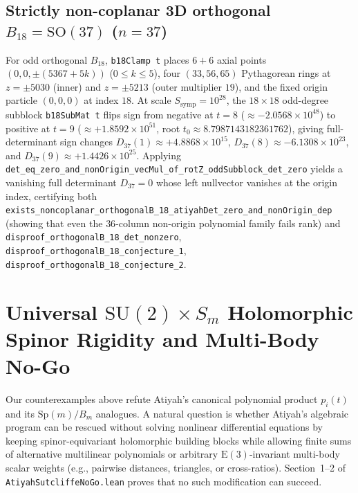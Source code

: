 \documentclass[11pt,reqno]{amsart}
\theoremstyle{remark}
\begin{document}
\subsection{Strictly non-coplanar 3D orthogonal $B_{18} = \mathrm{SO}(37)$ ($n = 37$)}
For odd orthogonal $B_{18}$, \texttt{b18Clamp t} places $6+6$ axial points $(0,0,\pm(5367 + 5k))$ ($0 \le k \le 5$), four $(33, 56, 65)$ Pythagorean rings at $z = \pm 5030$ (inner) and $z = \pm 5213$ (outer multiplier $19$), and the fixed origin particle $(0, 0, 0)$ at index $18$.
At scale $S_{\mathrm{symp}} = 10^{28}$, the $18 \times 18$ odd-degree subblock \texttt{b18SubMat t} flips sign from negative at $t = 8$ ($\approx -2.0568 \times 10^{48}$) to positive at $t = 9$ ($\approx +1.8592 \times 10^{51}$, root $t_0 \approx 8.7987143182361762$), giving full-determinant sign changes $D_{37}(1) \approx +4.8868 \times 10^{15}$, $D_{37}(8) \approx -6.1308 \times 10^{23}$, and $D_{37}(9) \approx +1.4426 \times 10^{25}$.
Applying \texttt{det\_eq\_zero\_and\_nonOrigin\_vecMul\_of\_rotZ\_oddSubblock\_det\_zero} yields a vanishing full determinant $D_{37} = 0$ whose left nullvector vanishes at the origin index, certifying both \texttt{exists\_noncoplanar\_orthogonalB\_18\_atiyahDet\_zero\_and\_nonOrigin\_dep} (showing that even the $36$-column non-origin polynomial family fails rank) and \texttt{disproof\_orthogonalB\_18\_det\_nonzero}, \texttt{disproof\_orthogonalB\_18\_conjecture\_1}, \texttt{disproof\_orthogonalB\_18\_conjecture\_2}.

\section{Universal $\mathrm{SU}(2) \times S_m$ Holomorphic Spinor Rigidity and Multi-Body No-Go}\label{sec:nogo}

Our counterexamples above refute Atiyah's canonical polynomial product $p_i(t)$ and its $\mathrm{Sp}(m)/B_m$ analogues.
A natural question is whether Atiyah's algebraic program can be rescued without solving nonlinear differential equations by keeping spinor-equivariant holomorphic building blocks while allowing finite sums of alternative multilinear polynomials or arbitrary $\mathrm{E}(3)$-invariant multi-body scalar weights (e.g., pairwise distances, triangles, or cross-ratios).
Section~1--2 of \texttt{AtiyahSutcliffeNoGo.lean} proves that no such modification can succeed.
\end{document}
